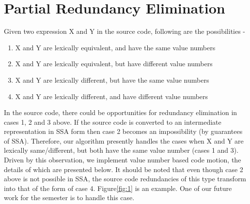\chapter{Partial Redundancy Elimination}\label{ch:pre}

Given two expression X and Y in the source code, following are the possibilities -
\begin{enumerate}
\item X and Y are lexically equivalent, and have the same value numbers
\item X and Y are lexically equivalent, but have different value numbers
\item X and Y are lexically different, but have the same value numbers
\item X and Y are lexically different, and have different value numbers
\end{enumerate}
In the source code, there could be opportunities for redundancy elimination in
cases 1, 2 and 3 above. If the source code is converted to an intermediate
representation in SSA form then case 2 becomes an impossibility (by guarantees of SSA). Therefore,
               our algorithm presently handles the cases when X and Y are
               lexically same/different, but both have the same value number (cases 1 and 3).
               Driven by this observation, we implement value number based code
               motion, the details of which are presented below. It should be
               noted that even though case 2 above is not possible in SSA,
               the source code redundancies  of this type transform into that
               of the form of case 4. Figure\ref{fig:1} is an example. One of our
               future work for the semester is to handle this case. %

